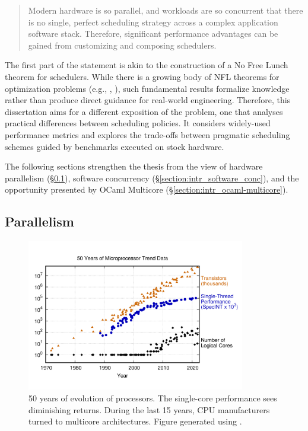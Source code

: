 \documentclass[12pt,a4paper,twoside]{report}
\begin{document}
\begin{quote}
    Modern hardware is so parallel, and workloads are so concurrent that there is no single, perfect scheduling strategy across a complex application software stack. Therefore, significant performance advantages can be gained from customizing and composing schedulers.
\end{quote} 

The first part of the statement is akin to the construction of a No Free Lunch theorem \cite{Ho2002} for schedulers. While there is a growing body of NFL theorems for optimization problems (e.g., \cite{Wolpert1997}, \cite{Igel2005}), such fundamental results formalize knowledge rather than produce direct guidance for real-world engineering. Therefore, this dissertation aims for a different exposition of the problem, one that analyses practical differences between scheduling policies. It considers widely-used performance metrics and explores the trade-offs between pragmatic scheduling schemes guided by benchmarks executed on stock hardware. 

The following sections strengthen the thesis from the view of hardware parallelism (\S\ref{section:intr_hardware_par}), software concurrency (\S\ref{section:intr_software_conc}), and the opportunity presented by OCaml Multicore (\S\ref{section:intr_ocaml-multicore}).

\subsection{Parallelism}
\label{section:intr_hardware_par}


\begin{figure}
    \centering
    \includegraphics[width=0.85\textwidth]{50-years-processor-trend.png}
    \caption{50 years of evolution of processors. The single-core performance sees diminishing returns. During the last 15 years, CPU manufacturers turned to multicore architectures. Figure generated using \cite{karlrupp48:online}.}
   \label{fig:50yrs}
\end{figure}
\end{document}
